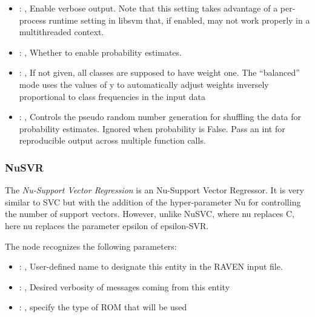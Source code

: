 \begin{itemize}
    \item {}: , 
      Enable verbose output. Note that this setting takes advantage
      of a per-process runtime setting in libsvm that, if enabled, may not
      work properly in a multithreaded context.

    \item {}: , 
      Whether to enable probability estimates.

    \item {}: \xmlDesc{[balanced]}, 
      If not given, all classes are supposed to have weight one.
      The “balanced” mode uses the values of y to automatically adjust weights
      inversely proportional to class frequencies in the input data

    \item {}: , 
      Controls the pseudo random number generation for shuffling
      the data for probability estimates. Ignored when probability is False.
      Pass an int for reproducible output across multiple function calls.
  \end{itemize}


\subsubsection{NuSVR}
  The  \textit{Nu-Support Vector Regression} is an Nu-Support Vector Regressor.
  It is very similar to SVC but with the addition of the hyper-parameter Nu for controlling the
  number of support vectors. However, unlike NuSVC, where nu replaces C,
  here nu replaces the parameter epsilon of epsilon-SVR.

  The  node recognizes the following parameters:
    \begin{itemize}
      \item {}: , 
        User-defined name to designate this entity in the RAVEN input file.
      \item {}: , 
        Desired verbosity of messages coming from this entity
      \item {}: , 
        specify the type of ROM that will be used
  \end{itemize}

